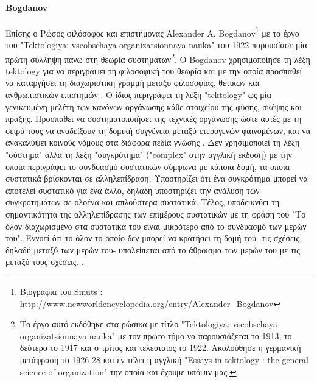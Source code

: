 \documentclass[a4paper,12pt,twoside]{report}
\begin{document}
{			\paragraph{Bogdanov}{Επίσης ο Ρώσος φιλόσοφος και επιστήμονας Alexander A. Bogdanov\footnote{Βιογραφία του Smuts : \url{http://www.newworldencyclopedia.org/entry/Alexander_Bogdanov}} με το έργο του "Tektologiya: vseobschaya organizatsionnaya nauka" του 1922 παρουσίασε μία πρώτη σύλληψη πάνω στη θεωρία συστημάτων\footnote{Το έργο αυτό εκδόθηκε στα ρώσικα με τίτλο "Tektologiya: vseobschaya organizatsionnaya nauka" με τον πρώτο τόμο να παρουσιάζεται το 1913, το δεύτερο το 1917 και ο τρίτος και τελευταίος το 1922. Ακολούθησε η γερμανική μετάφραση το 1926-28 και εν τέλει η αγγλική "Essays in tektology : the general science of organization" \cite{EssaysInTektology:Bogdanov1984} την οποία και έχουμε υπόψιν μας.}. Ο Bogdanov χρησιμοποίησε τη λέξη tektology για να περιγράψει τη φιλοσοφική του θεωρία και με την οποία προσπαθεί να καταργήσει τη διαχωριστική γραμμή μεταξύ φιλοσοφίας, θετικών και ανθρωπιστικών επιστημών \cite{InstrumentalReasoningAndSystemsMethodologym:Mattessich1978}. Ο ίδιος περιγράφει τη λέξη "tektology" ως μία γενικευμένη μελέτη των κανόνων οργάνωσης κάθε στοιχείου της φύσης, σκέψης και πράξης. Προσπαθεί να συστηματοποιήσει της τεχνικές οργάνωσης ώστε αυτές με τη σειρά τους να αναδείξουν τη δομική συγγένεια μεταξύ ετερογενών φαινομένων, και να ανακαλύψει κοινούς νόμους στα διάφορα πεδία γνώσης \cite{AleksandrBogdanovAndSystemsTheory:Arran2000}. Δεν χρησιμοποιεί τη λέξη "σύστημα" αλλά τη λέξη "συγκρότημα" ("complex" στην αγγλική έκδοση) με την οποία περιγράφει το συνδυασμό συστατικών σύμφωνα με κάποια δομή, τα οποία συστατικά βρίσκονται σε αλληλεπίδραση. Υποστηρίζει ότι ένα συγκρότημα μπορεί να αποτελεί συστατικό για ένα άλλο, δηλαδή υποστηρίζει την ανάλυση των συγκροτημάτων σε ολοένα και απλούστερα συστατικά. Τέλος, υποδεικνύει τη σημαντικότητα της αλληλεπίδρασης των επιμέρους συστατικών με τη φράση του "Το όλον διαχωρισμένο στα συστατικά του είναι μικρότερο από το συνδυασμό των μερών του". Εννοεί ότι το όλον το οποίο δεν μπορεί να κρατήσει τη δομή του -τις σχέσεις δηλαδή μεταξύ των μερών του- υπολείπεται από το άθροισμα των μερών του με τις μεταξύ τους σχέσεις. \cite{AleksandrBogdanovAndSystemsTheory:Arran2000}.
			}
}
\end{document}
